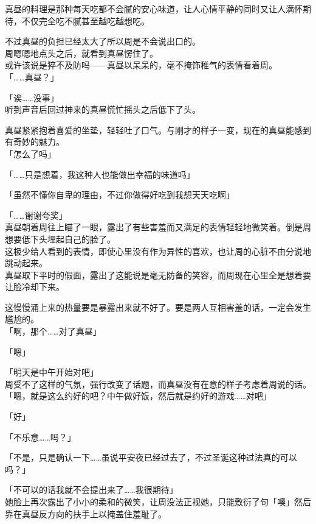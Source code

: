 真昼的料理是那种每天吃都不会腻的安心味道，让人心情平静的同时又让人满怀期待，不仅完全吃不腻甚至越吃越想吃。

不过真昼的负担已经太大了所以周是不会说出口的。\\

周嗯嗯地点头之后，就看到真昼愣住了。\\

或许该说是猝不及防吗——真昼以呆呆的，毫不掩饰稚气的表情看着周。\\

「……真昼？」

「诶……没事」\\

听到声音后回过神来的真昼慌忙摇头之后低下了头。

真昼紧紧抱着喜爱的坐垫，轻轻吐了口气。与刚才的样子一变，现在的真昼能感到有奇妙的魅力。\\

「怎么了吗」

「……只是想着，我这种人也能做出幸福的味道吗」

「虽然不懂你自卑的理由，不过你做得好吃到我想天天吃啊」

「……谢谢夸奖」\\

真昼朝着周往上瞄了一眼，露出了有些害羞而又满足的表情轻轻地微笑着。倒是周想要低下头埋起自己的脸了。\\

这极少给人看到的表情，即使心里没有作为异性的喜欢，也让周的心脏不由分说地跳动起来。\\

真昼取下平时的假面，露出了这能说是毫无防备的笑容，而周现在心里全是想着要让脸冷却下来。

这慢慢涌上来的热量要是暴露出来就不好了。要是两人互相害羞的话，一定会发生尴尬的。\\

「啊，那个……对了真昼」

「嗯」

「明天是中午开始对吧」\\

周受不了这样的气氛，强行改变了话题，而真昼没有在意的样子考虑着周说的话。\\

「嗯，就是这么约好的吧？中午做好饭，然后就是约好的游戏……对吧」

「好」

「不乐意……吗？」

「不是，只是确认一下……虽说平安夜已经过去了，不过圣诞这种过法真的可以吗？」

「不可以的话我就不会提出来了……我很期待」\\

她脸上再次露出了小小的柔和的微笑，让周没法正视她，只能敷衍了句「噢」然后靠在真昼反方向的扶手上以掩盖住羞耻了。

